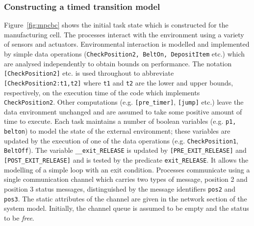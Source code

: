 \subsubsection{Constructing a timed transition model}  
Figure~\ref{fig:mpcbc} shows the initial task state which is constructed
for the manufacturing cell. 
The processes interact with the environment using a
variety of sensors and actuators. Environmental interaction is modelled and
implemented by simple data operations ({\tt CheckPosition2, BeltOn,
DepositItem} etc.) which are analysed independently to obtain bounds on
performance.  The notation \verb'[CheckPosition2]' etc. is used throughout to
abbreviate \verb'[CheckPosition2:t1,t2]' where {\tt t1} and {\tt t2} are the
lower and upper bounds, respectively, on the execution time of the code which
implements \verb'CheckPosition2'.  Other computations
(e.g. \verb'[pre_timer]', \verb'[jump]' etc.) leave the data environment
unchanged and are assumed to take some positive amount of time to execute.
Each task maintains a number of boolean variables (e.g. {\tt p1, belton\/}) to
model the state of the external environment; these variables are updated by
the execution of one of the data operations (e.g. \verb'CheckPosition1',
\verb'BeltOff'). The variable \verb'__exit_RELEASE' is updated by
\verb'[PRE_EXIT_RELEASE]' and \verb'[POST_EXIT_RELEASE]' and is tested by the
predicate \verb'exit_RELEASE'.  It allows the modelling of a simple loop with
an exit condition.  Processes communicate using a single communication channel
which carries two types of message, position 2 and position 3 status messages,
distinguished by the message identifiers {\tt pos2\/} and {\tt pos3\/}. The
static attributes of the channel are given in the network section of the
system model. Initially, the channel queue is assumed to be empty and the
status to be \emph{free}.

